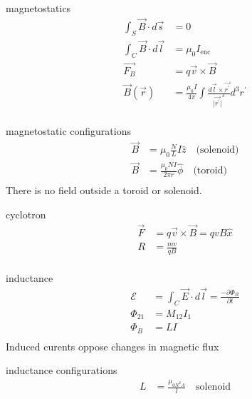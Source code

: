 \documentclass[avery5388, frame]{flashcards}
\begin{document}
\begin{flashcard}{magnetostatics}
  {
    \begin{align*}
      \int_{S} \vec{B} \cdot d\vec{s} &= 0\\
      \int_{C} \vec{B} \cdot d\vec{l} &= \mu_{0} I_{\textrm{enc}}\\
      \vec{F_{B}} &= q\vec{v} \times \vec{B}\\
      \vec{B}(\vec{r}) &= \frac{\mu_{0} I}{4 \pi} \int \frac{d\vec{l} \times \vec{r^{'}}}{{\lvert \vec{r^{'}}\lvert}^{3}} d^{3}r^{'}\\
    \end{align*}
  }
\end{flashcard}

\begin{flashcard}{magnetostatic configurations}
  {
    \begin{align*}
      \vec{B} &= \mu_{0} \frac{N}{L} I \hat{z} \quad \textrm{(solenoid)}\\
      \vec{B} &= \frac{\mu_{0} N I}{2 \pi r} \hat{\phi} \quad \textrm{(toroid)}\\
    \end{align*}
    There is no field outside a toroid or solenoid.
  }
\end{flashcard}

\begin{flashcard}{cyclotron}
  {
    \begin{align*}
      \vec{F} &= q \vec{v} \times \vec{B} = qvB \hat{x}\\
      R &= \frac{mv}{qB}\\
    \end{align*}
  }
\end{flashcard}

\begin{flashcard}{inductance}
  {
    \begin{align*}
      \mathcal{E} &= \int_{C} \vec{E} \cdot d\vec{l} = \frac{- \partial \Phi_{B}}{\partial t}\\
      \Phi_{21} &= M_{12} I_{1}\\
      \Phi_{B} &= L I\\
    \end{align*}
    Induced curents oppose changes in magnetic flux
  }
\end{flashcard}

\begin{flashcard}{inductance configurations}
  {
    \begin{align*}
      L &= \frac{\mu_{0 N^{2} A}}{l} \quad \textrm{solenoid}\\
    \end{align*}
  }
\end{flashcard}
\end{document}
